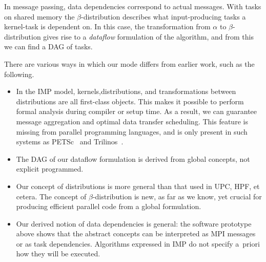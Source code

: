 In message passing, data dependencies correspond to actual messages.
With tasks on shared
memory the $\beta$-distribution
describes what input-producing tasks a kernel-task is dependent on. In
this case, the transformation from $\alpha$ to $\beta$-distribution
gives rise to a \emph{dataflow} formulation of the
algorithm, and from this we can find a \ac{DAG} of tasks.

There are various ways in which our mode differs from earlier work,
such as the following.
\begin{itemize}
\item In the \ac{IMP} model, kernels,distributions, and
  transformations between distributions are all first-class
  objects. This makes it possible to perform formal analysis during
  compiler or setup time. As a result, we can guarantee message
  aggregation and optimal data transfer scheduling. This feature is
  missing from parallel programming languages, and is only present
  in such systems as PETSc~\cite{GrSm:petsc} and Trilinos~\cite{Trilinos}.
\item The \ac{DAG} of our dataflow formulation is derived from global
  concepts, not explicit programmed.
\item Our concept of distributions is more general than that used in
  UPC, HPF, et cetera. The concept of $\beta$-distribution is new, as
  far as we know, yet crucial for producing efficient parallel code
  from a global formulation.
\item Our derived notion of data dependencies is general: the software
  prototype above shows that the abstract concepts can be interpreted
  as MPI messages or as task dependencies. Algorithms expressed in
  \ac{IMP} do not specify a~priori how they will be executed.
\end{itemize}
